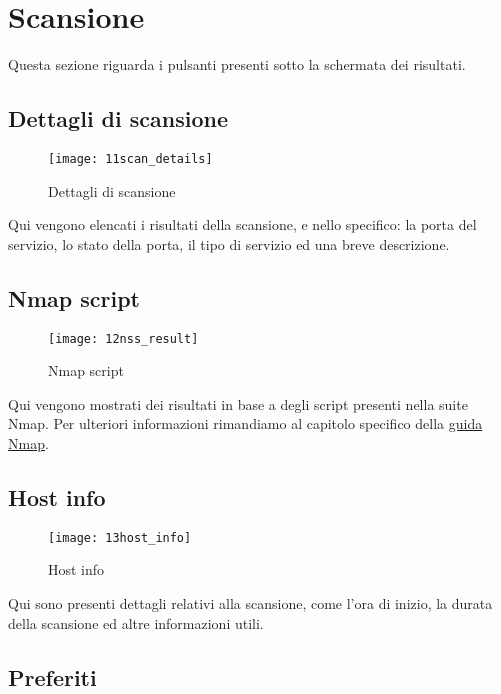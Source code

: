 \section{Scansione}
\label{sec:ContentsScan}

Questa sezione riguarda i pulsanti presenti sotto la schermata dei risultati.

\subsection{Dettagli di scansione}
\label{sec:ContentsScanDetails}

\begin{figure}[h]
  \centering
  \texttt{[image: 11scan\_details]}
  \caption{Dettagli di scansione}
  \label{fig:ScanDetails}
\end{figure}
Qui vengono elencati i risultati della scansione, e nello specifico: la porta 
del servizio, lo stato della porta, il tipo di servizio ed una breve descrizione.

\subsection{Nmap script}
\label{sec:NmapScript}

\begin{figure}[h]
  \centering
  \texttt{[image: 12nss\_result]}
  \caption{Nmap script}
  \label{fig:NmapScript}
\end{figure}
Qui vengono mostrati dei risultati in base a degli script presenti nella suite 
Nmap. Per ulteriori informazioni rimandiamo al capitolo specifico della 
\href{http://nmap.org/book/nse.html}{guida Nmap}.

\subsection{Host info}
\label{sec:HostInfo}

\begin{figure}[h]
  \centering
  \texttt{[image: 13host\_info]}
  \caption{Host info}
  \label{fig:HostInfo}
\end{figure}
Qui sono presenti dettagli relativi alla scansione, come l'ora di inizio, la 
durata della scansione ed altre informazioni utili.

\subsection{Preferiti}
\label{sec:Bookmarks}


